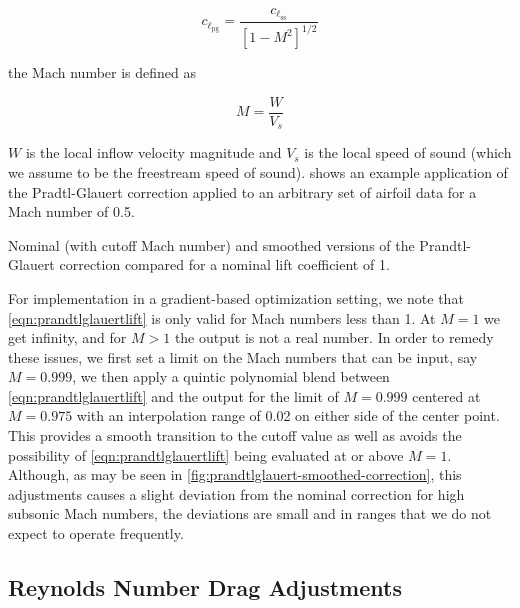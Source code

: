 \begin{equation}
    \label{eqn:prandtlglauertlift}
    c_{\ell_\text{pg}} = \frac{c_{\ell_\text{ss}}}{\left[1-M^2\right]^{1/2}}
\end{equation}

\where the Mach number is defined as

\begin{equation}
    M = \frac{W}{V_s}
\end{equation}

\where \(W\) is the local inflow velocity magnitude and \(V_s\) is the local speed of sound (which we assume to be the freestream speed of sound).
%
 shows an example application of the Pradtl-Glauert correction applied to an arbitrary set of airfoil data for a Mach number of 0.5.

\begin{marginfigure}
	
    \caption{Nominal (with cutoff Mach number) and smoothed versions of the Prandtl-Glauert correction compared for a nominal lift coefficient of 1.}
	\label{fig:prandtlglauert-smoothed-correction}
\end{marginfigure}

For implementation in a gradient-based optimization setting, we note that \cref{eqn:prandtlglauertlift} is only valid for Mach numbers less than 1.
%
At \(M=1\) we get infinity, and for \(M>1\) the output is not a real number.
%
In order to remedy these issues, we first set a limit on the Mach numbers that can be input, say \(M=0.999\), we then apply a quintic polynomial blend between \cref{eqn:prandtlglauertlift} and the output for the limit of \(M=0.999\) centered at \(M=0.975\) with an interpolation range of 0.02 on either side of the center point.
%
This provides a smooth transition to the cutoff value as well as avoids the possibility of \cref{eqn:prandtlglauertlift} being evaluated at or above \(M=1\).
%
Although, as may be seen in \cref{fig:prandtlglauert-smoothed-correction}, this adjustments causes a slight deviation from the nominal correction for high subsonic Mach numbers, the deviations are small and in ranges that we do not expect to operate frequently.


\subsection{Reynolds Number Drag Adjustments}

